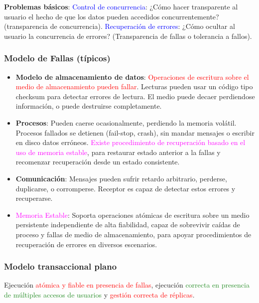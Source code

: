 \textbf{Problemas básicos}: \textcolor{blue}{Control de concurrencia}: ¿Cómo hacer transparente al usuario el hecho de que los datos pueden accedidos concurrentemente? (transparencia de concurrencia). \textcolor{blue}{Recuperación de errores}: ¿Cómo ocultar al usuario la concurrencia de errores? (Transparencia de fallas o tolerancia a fallos).

\subsubsection{Modelo de Fallas (típicos)}
\begin{itemize}

    \item \textbf{Modelo de almacenamiento de datos}: \textcolor{red}{Operaciones de escritura sobre el medio de almacenamiento pueden fallar}. \textcolor{Sepia}{Lecturas pueden usar un código tipo checksum para detectar errores de lectura}. El medio puede decaer perdiendose información, o puede destruirse completamente.

    \item \textbf{Procesos}: Pueden caerse ocasionalmente, perdiendo la memoria volátil. Procesos fallados se detienen (fail-stop, crash), sin mandar mensajes o escribir en disco datos erróneos. \textcolor{Fuchsia}{Existe procedimiento de recuperación basado en el uso de memoria estable}, para restaurar estado anterior a la fallas y recomenzar recuperación desde un estado consistente.

    \item \textbf{Comunicación}: \textcolor{Sepia}{Mensajes pueden sufrir retardo arbitrario, perderse, duplicarse, o corromperse}. Receptor es capaz de detectar estos errores y recuperarse.

    \item \textcolor{Fuchsia}{Memoria Estable}: Soporta operaciones atómicas de escritura sobre un medio persistente independiente de alta fiabilidad, \textcolor{Sepia}{capaz de sobrevivir caídas de proceso y fallas de medio de almacenamiento}, para apoyar procedimientos de recuperación de errores en diversos escenarios.
\end{itemize}

\subsubsection{Modelo transaccional plano}
Ejecución \textcolor{red}{atómica y fiable en presencia de fallas}, ejecución \textcolor{ForestGreen}{correcta en presencia de múltiples accesos de usuarios} y \textcolor{red}{gestión correcta de réplicas}.

